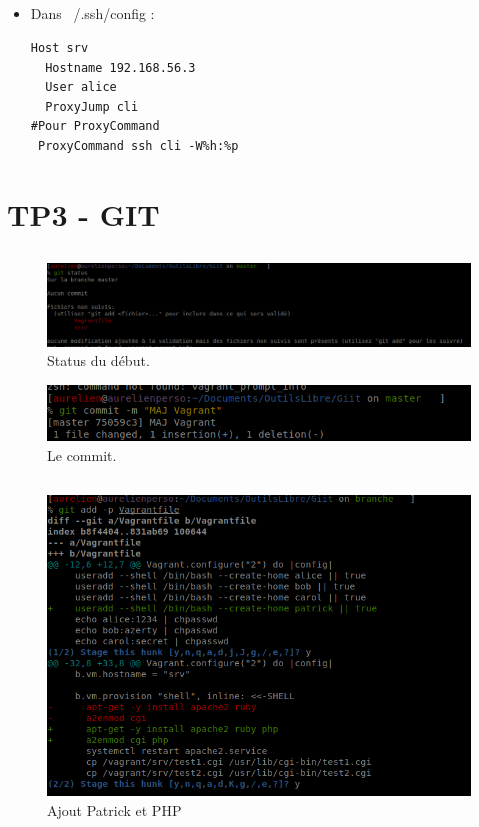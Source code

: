 \documentclass{article}
\begin{document}
\subsection{}
\begin{itemize}
    \item Dans ~/.ssh/config :
\begin{lstlisting}
Host srv
  Hostname 192.168.56.3
  User alice
  ProxyJump cli
#Pour ProxyCommand
 ProxyCommand ssh cli -W%h:%p
\end{lstlisting}
\end{itemize}

\newpage

\section{TP3 - GIT}

\subsection{}


\begin{figure}[h]
\centering
\includegraphics[width=\textwidth]{screen/git1.png}
\caption{\label{fig:frog}Status du début.}
\end{figure}

\begin{figure}[h]
\centering
\includegraphics[width=0.7\columnwidth]{screen/git2.png}
\caption{\label{fig:frog}Le commit.}
\end{figure}

\subsection{}

\begin{figure}[h]
\centering
\includegraphics[width=0.7\columnwidth]{screen/git2_1.png}
\caption{\label{fig:frog}Ajout Patrick et PHP}
\end{figure}
\end{document}
